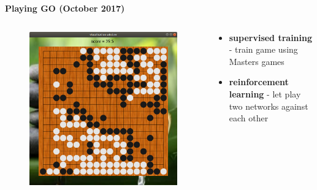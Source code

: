 \documentclass[xcolor=dvipsnames]{beamer}
\begin{document}
\begin{frame}{\bf Playing GO (October 2017)}


  \begin{columns}
  \begin{column}{0.5\textwidth}

    \begin{figure}[!htb]
      \centering
      \includegraphics[scale=0.18]{../../pictures/go_board.png}
    \end{figure}


  \end{column}
  \begin{column}{0.5\textwidth}  %

    \scriptsize
    {
      \begin{itemize}
        \item {\bf supervised training} - train game using Masters games
        \item {\bf reinforcement learning} - let play two networks against each other
      \end{itemize}
    }
  \end{column}
  \end{columns}

\end{frame}
\end{document}
